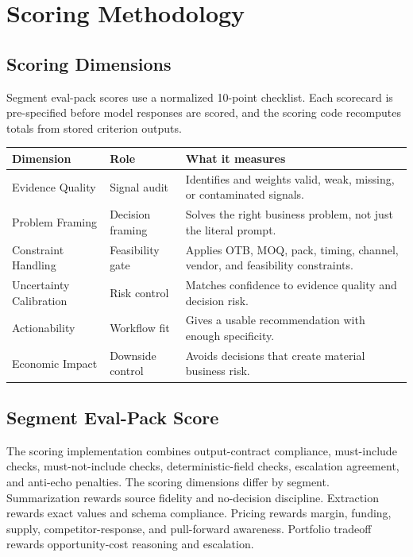 \documentclass[11pt]{article}
\begin{document}
\section{Scoring Methodology}

\subsection{Scoring Dimensions}

Segment eval-pack scores use a normalized 10-point checklist. Each scorecard is pre-specified before model responses are scored, and the scoring code recomputes totals from stored criterion outputs.

\begin{center}
\begin{tabularx}{\textwidth}{>{\raggedright\arraybackslash}p{} p{} X}
\toprule
Dimension & Role & What it measures \\
\midrule
Evidence Quality & Signal audit & Identifies and weights valid, weak, missing, or contaminated signals. \\
Problem Framing & Decision framing & Solves the right business problem, not just the literal prompt. \\
Constraint Handling & Feasibility gate & Applies OTB, MOQ, pack, timing, channel, vendor, and feasibility constraints. \\
Uncertainty Calibration & Risk control & Matches confidence to evidence quality and decision risk. \\
Actionability & Workflow fit & Gives a usable recommendation with enough specificity. \\
Economic Impact & Downside control & Avoids decisions that create material business risk. \\
\bottomrule
\end{tabularx}
\end{center}

\subsection{Segment Eval-Pack Score}

The scoring implementation combines output-contract compliance, must-include checks, must-not-include checks, deterministic-field checks, escalation agreement, and anti-echo penalties. The scoring dimensions differ by segment. Summarization rewards source fidelity and no-decision discipline. Extraction rewards exact values and schema compliance. Pricing rewards margin, funding, supply, competitor-response, and pull-forward awareness. Portfolio tradeoff rewards opportunity-cost reasoning and escalation.
\end{document}

